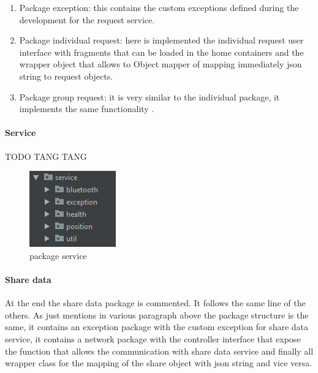 \begin{enumerate}
\item Package exception: this contains the custom exceptions defined during the development for the request service.
\item Package individual request: here is implemented the individual request user interface with fragments that can be loaded in the home containers and the wrapper object that allows to Object mapper of mapping immediately json string to request objects. 
\item Package group request: it is very similar to the individual package, it implements the same functionality . 
\end{enumerate}
	
\paragraph{Service}
TODO TANG TANG

\begin{figure}[H]
\includegraphics[width=\linewidth]{images/Service.png}
\caption{ package service }
\label{fig:pkgsharedata}
\end{figure}

\paragraph{Share data}
At the end the share data package is commented. It follows the same line of the others. As just mentions in various paragraph above the package structure is the same, it contains an exception package with the custom exception for share data service, it contains a network package with the controller interface that expose the function that allows the communication with share data service and finally all wrapper class for the mapping of the share object with json string and vice versa.


